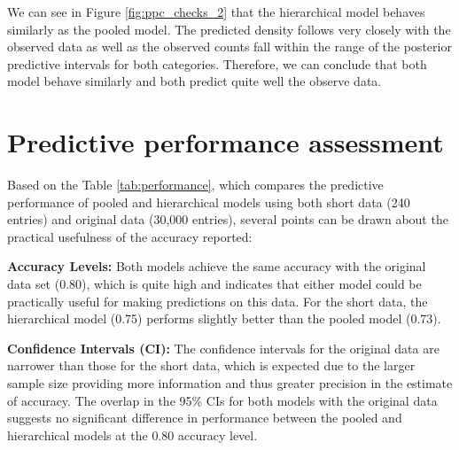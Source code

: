 \documentclass[a4paper]{artikel3}
\begin{document}
We can see in Figure \ref{fig:ppc_checks_2} that the hierarchical model behaves similarly as the pooled model. The predicted density follows very closely with the observed data as well as the observed counts fall within the range of the posterior predictive intervals for both categories. Therefore, we can conclude that both model behave similarly and both predict quite well the observe data.

\section{Predictive performance assessment}

Based on the Table \ref{tab:performance}, which compares the predictive performance of pooled and hierarchical models using both short data (240 entries) and original data (30,000 entries), several points can be drawn about the practical usefulness of the accuracy reported:

\textbf{Accuracy Levels:}
Both models achieve the same accuracy with the original data set (0.80), which is quite high and indicates that either model could be practically useful for making predictions on this data. For the short data, the hierarchical model (0.75) performs slightly better than the pooled model (0.73). 

\textbf{Confidence Intervals (CI):}
The confidence intervals for the original data are narrower than those for the short data, which is expected due to the larger sample size providing more information and thus greater precision in the estimate of accuracy.
The overlap in the 95\% CIs for both models with the original data suggests no significant difference in performance between the pooled and hierarchical models at the 0.80 accuracy level.
\end{document}
